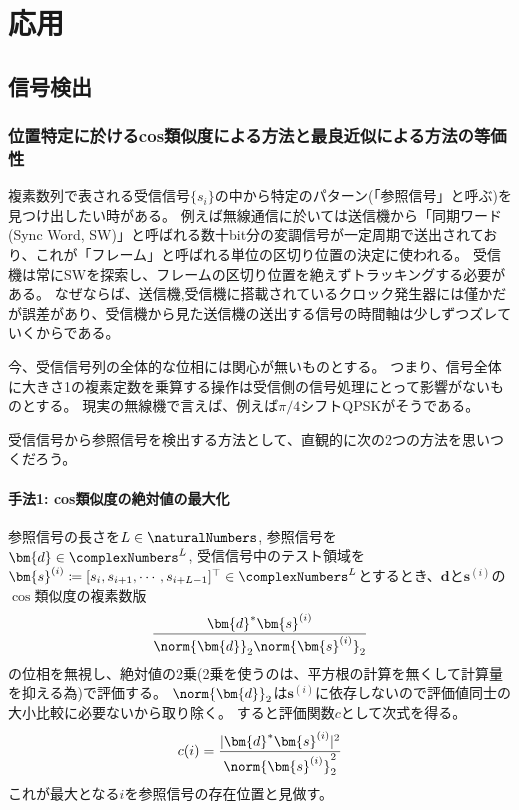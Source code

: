 \part{応用}
    \chapter{信号検出}
        \section{位置特定に於けるcos類似度による方法と最良近似による方法の等価性}
            複素数列で表される受信信号$\{s_i\}$の中から特定のパターン(「参照信号」と呼ぶ)を見つけ出したい時がある。
            例えば無線通信に於いては送信機から「同期ワード (Sync Word, SW)」と呼ばれる数十bit分の変調信号が一定周期で送出されており、これが「フレーム」と呼ばれる単位の区切り位置の決定に使われる。
            受信機は常にSWを探索し、フレームの区切り位置を絶えずトラッキングする必要がある。
            なぜならば、送信機,受信機に搭載されているクロック発生器には僅かだが誤差があり、受信機から見た送信機の送出する信号の時間軸は少しずつズレていくからである。
            \par
            今、受信信号列の全体的な位相には関心が無いものとする。
            つまり、信号全体に大きさ1の複素定数を乗算する操作は受信側の信号処理にとって影響がないものとする。
            現実の無線機で言えば、例えば$\pi/4$シフトQPSKがそうである。
            \par
            受信信号から参照信号を検出する方法として、直観的に次の2つの方法を思いつくだろう。
            \subsection{手法1: cos類似度の絶対値の最大化}
                \label{手法1: cos類似度の絶対値の最大化}
                参照信号の長さを$L\in\naturalNumbers$, 参照信号を$\bm{d} \in \complexNumbers^L$, 受信信号中のテスト領域を$\bm{s}^{(i)} \coloneqq [s_i,s_{i+1},\cdots,s_{i+L-1}]^\top \in \complexNumbers^L$とするとき、$\bm{d}$と$\bm{s}^{(i)}$の$\cos$類似度の複素数版
                \[ \frac{\bm{d}^*\bm{s}^{(i)}}{\norm{\bm{d}}_2\norm{\bm{s}^{(i)}}_2} \]
                の位相を無視し、絶対値の2乗(2乗を使うのは、平方根の計算を無くして計算量を抑える為)で評価する。
                $\norm{\bm{d}}_2$は$\bm{s}^{(i)}$に依存しないので評価値同士の大小比較に必要ないから取り除く。
                すると評価関数$c$として次式を得る。
                \[ c(i) = \frac{|\bm{d}^*\bm{s}^{(i)}|^2}{\norm{\bm{s}^{(i)}}_2^2} \]
                これが最大となる$i$を参照信号の存在位置と見做す。
